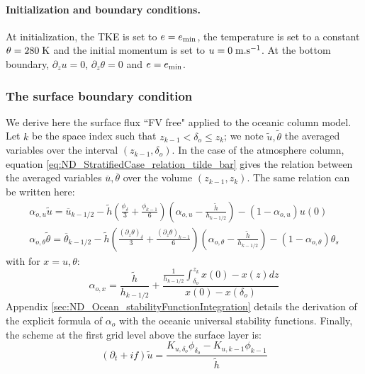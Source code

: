\paragraph{Initialization and boundary conditions.}
At initialization, the TKE is set to $e=e_{\rm min}$, 
the temperature is set to a constant $\theta = 280 \; {\rm K}$
and the initial momentum is set to $u = 0 \; {\rm m}.{\rm s}^{-1}$.
At the bottom boundary,
$\partial_z u = 0$,
$\partial_z \theta = 0$ and $e=e_{\rm min}$.

\subsubsection{The surface boundary condition}
We derive here the surface flux ``FV free" applied to the oceanic
column model. Let $k$ be the space index such that
$z_{k-1} < \delta_o \leq z_k$;
we note $\widetilde{u}, \widetilde{\theta}$
the averaged variables over the interval $(z_{k-1}, \delta_o)$.
In the case of the atmosphere column, equation
\eqref{eq:ND_StratifiedCase_relation_tilde_bar}
gives the relation between the averaged variables
$\overline{u}, \overline{\theta}$ over the volume $(z_{k-1}, z_{k})$.
The same relation can be written here:
\begin{equation}
\begin{aligned}
\label{eq:ND_Ocean_relation_tilde_bar}
\alpha_{o, u}\widetilde{u} = \overline{u}_{k-1/2} -
\widetilde{h}
	\left(\frac{\phi_{\delta}}{3} + \frac{\phi_{k-1}}{6}\right)
	\left(\alpha_{o, u} - \frac{\widetilde{h}}{h_{k-1/2}}\right)
	- (1 - \alpha_{o, u})u(0)\\
\alpha_{o, \theta}
\widetilde{\theta}
= \overline{\theta}_{k-1/2} -
	\widetilde{h}\left(\frac{{(\partial_z \theta)}_{\delta}}{3}
	+ \frac{{(\partial_z \theta)}_{k-1}}{6}\right)
	\left(\alpha_{o, \theta}-\frac{\widetilde{h}}{h_{k-1/2}}\right)
 - (1 - \alpha_{o, \theta})\theta_s
\end{aligned}
\end{equation}
with for $x = u, \theta$:
\begin{equation}
	\alpha_{o, x} = \frac{\widetilde{h}}{h_{k-1/2}} +
	\frac{\frac{1}{{h_{k-1/2}}}\int_{\delta_{o}}^{z_k} x(0) - x(z)
	dz}{x(0) - x(\delta_{o})}
\end{equation}
Appendix \ref{sec:ND_Ocean_stabilityFunctionIntegration}
details the derivation of the explicit formula of $\alpha_{o}$
with the oceanic universal stability functions.
Finally, the scheme at the first grid level above
the surface layer is:
\begin{equation}
	\label{eq:ND_Ocean_semiDiscreteEkmanEqFVfree}
	(\partial_t+if) \widetilde{u}
	= \frac{K_{u, \delta_o}\phi_{\delta_o}
	- K_{u,k-1} \phi_{k-1}}{\widetilde{h}}
\end{equation}
